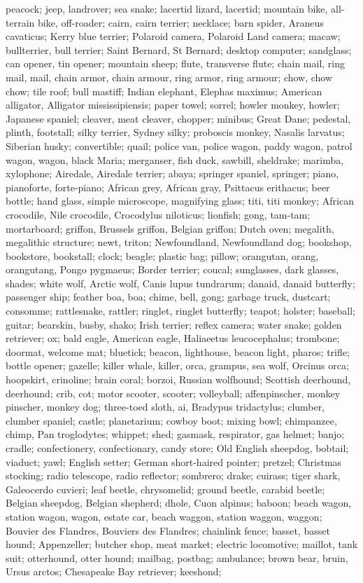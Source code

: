 \documentclass[runningheads]{llncs}
\begin{document}
\begin{enumerate}
peacock; jeep, landrover; sea snake; lacertid lizard, lacertid; mountain bike, all-terrain bike, off-roader; cairn, cairn terrier; necklace; barn spider, Araneus cavaticus; Kerry blue terrier; Polaroid camera, Polaroid Land camera; macaw; bullterrier, bull terrier; Saint Bernard, St Bernard; desktop computer; sandglass; can opener, tin opener; mountain sheep; flute, transverse flute; chain mail, ring mail, mail, chain armor, chain armour, ring armor, ring armour; chow, chow chow; tile roof; bull mastiff; Indian elephant, Elephas maximus; American alligator, Alligator mississipiensis; paper towel; sorrel; howler monkey, howler; Japanese spaniel; cleaver, meat cleaver, chopper; minibus; Great Dane; pedestal, plinth, footstall; silky terrier, Sydney silky; proboscis monkey, Nasalis larvatus; Siberian husky; convertible; quail; police van, police wagon, paddy wagon, patrol wagon, wagon, black Maria; merganser, fish duck, sawbill, sheldrake; marimba, xylophone; Airedale, Airedale terrier; abaya; springer spaniel, springer; piano, pianoforte, forte-piano; African grey, African gray, Psittacus erithacus; beer bottle; hand glass, simple microscope, magnifying glass; titi, titi monkey; African crocodile, Nile crocodile, Crocodylus niloticus; lionfish; gong, tam-tam; mortarboard; griffon, Brussels griffon, Belgian griffon; Dutch oven; megalith, megalithic structure; newt, triton; Newfoundland, Newfoundland dog; bookshop, bookstore, bookstall; clock; beagle; plastic bag; pillow; orangutan, orang, orangutang, Pongo pygmaeus; Border terrier; coucal; sunglasses, dark glasses, shades; white wolf, Arctic wolf, Canis lupus tundrarum; danaid, danaid butterfly; passenger ship; feather boa, boa; chime, bell, gong; garbage truck, dustcart; consomme; rattlesnake, rattler; ringlet, ringlet butterfly; teapot; holster; baseball; guitar; bearskin, busby, shako; Irish terrier; reflex camera; water snake; golden retriever; ox; bald eagle, American eagle, Haliaeetus leucocephalus; trombone; doormat, welcome mat; bluetick; beacon, lighthouse, beacon light, pharos; trifle; bottle opener; gazelle; killer whale, killer, orca, grampus, sea wolf, Orcinus orca; hoopskirt, crinoline; brain coral; borzoi, Russian wolfhound; Scottish deerhound, deerhound; crib, cot; motor scooter, scooter; volleyball; affenpinscher, monkey pinscher, monkey dog; three-toed sloth, ai, Bradypus tridactylus; clumber, clumber spaniel; castle; planetarium; cowboy boot; mixing bowl; chimpanzee, chimp, Pan troglodytes; whippet; shed; gasmask, respirator, gas helmet; banjo; cradle; confectionery, confectionary, candy store; Old English sheepdog, bobtail; viaduct; yawl; English setter; German short-haired pointer; pretzel; Christmas stocking; radio telescope, radio reflector; sombrero; drake; cuirass; tiger shark, Galeocerdo cuvieri; leaf beetle, chrysomelid; ground beetle, carabid beetle; Belgian sheepdog, Belgian shepherd; dhole, Cuon alpinus; baboon; beach wagon, station wagon, wagon, estate car, beach waggon, station waggon, waggon; Bouvier des Flandres, Bouviers des Flandres; chainlink fence; basset, basset hound; Appenzeller; butcher shop, meat market; electric locomotive; maillot, tank suit; otterhound, otter hound; mailbag, postbag; ambulance; brown bear, bruin, Ursus arctos; Chesapeake Bay retriever; keeshond; 
\end{enumerate}
\end{document}
